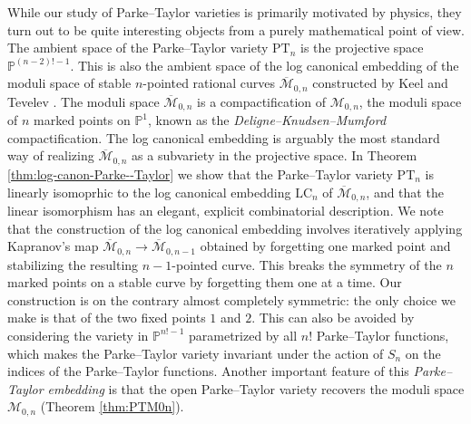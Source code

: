 \documentclass[12pt, reqno]{amsart}
\numberwithin{equation}{section}
\theoremstyle{plain}
\theoremstyle{definition}
\newcommand{\monbar}{\overline{\mathcal{M}}_{0, n}}
\begin{document}
While our study of Parke--Taylor varieties is primarily motivated by physics, they turn out to be quite interesting objects from a purely mathematical point of view. The ambient space of the Parke--Taylor variety $\mathrm{PT}_n$ is the projective space $\mathbb{P}^{(n-2)!-1}$. This is also the ambient space of the log canonical embedding of the moduli space of stable $n$-pointed rational curves $\overline{\mathcal{M}}_{0,n}$ constructed by Keel and Tevelev \cite{keel2009equations}. The moduli space $\overline{\mathcal{M}}_{0,n}$ is a compactification of $\mathcal{M}_{0,n}$, the moduli space of $n$ marked points on $\mathbb{P}^1$, known as the \emph{Deligne--Knudsen--Mumford} compactification.
The log canonical embedding is arguably the most standard way of realizing $\overline{\mathcal{M}}_{0,n}$ as a subvariety in the projective space. 
In Theorem \ref{thm:log-canon-Parke--Taylor} we show that the Parke--Taylor variety $\mathrm{PT}_n$ is linearly isomoprhic to the log canonical embedding $\mathrm{LC}_n$ of $\overline{\mathcal{M}}_{0,n}$, and that the linear isomorphism has an elegant, explicit combinatorial description.
We note that the construction of the log canonical embedding involves iteratively applying Kapranov's map $\monbar\to\overline{\mathcal{M}}_{0,n-1}$ \cite{kapranov1993veronese} obtained by forgetting one marked point and stabilizing the resulting $n-1$-pointed curve. This breaks the symmetry of the $n$ marked points on a stable curve by forgetting them one at a time. 
Our construction is on the contrary almost completely symmetric: the only choice we make is that of the two fixed points $1$ and $2$. 
This can also be avoided by considering the variety in $\mathbb{P}^{n!-1}$ parametrized by all $n!$ Parke--Taylor functions, which makes the Parke--Taylor variety invariant under the action of $S_n$ on the indices of the Parke--Taylor functions.
Another important feature of this \emph{Parke--Taylor embedding} is that the open Parke--Taylor variety recovers the moduli space $\mathcal{M}_{0,n}$ (Theorem \ref{thm:PTM0n}). 
\end{document}
